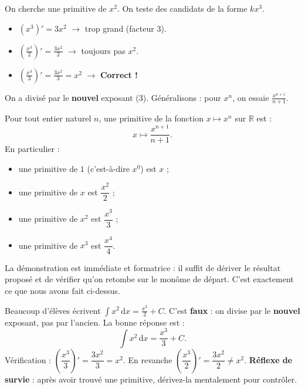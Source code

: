 \documentclass[11pt]{article}
\begin{document}
\begin{experience}
On cherche une primitive de $x^2$. On teste des candidats de la forme $k x^3$.
\begin{itemize}
\item $(x^3)' = 3x^2$ $\to$ trop grand (facteur 3).
\item $\left(\frac{x^3}{2}\right)' = \frac{3x^2}{2}$ $\to$ toujours pas $x^2$.
\item $\left(\frac{x^3}{3}\right)' = \frac{3x^2}{3} = x^2$ $\to$ \textbf{Correct !}
\end{itemize}
On a divisé par le \textbf{nouvel} exposant (3). Généralisons : pour $x^n$, on essaie $\frac{x^{n+1}}{n+1}$.
\end{experience}

\begin{propriete}
Pour tout entier naturel $n$, une primitive de la fonction $x \mapsto x^{n}$ sur $\mathbb{R}$ est :
\[ x \mapsto \frac{x^{n+1}}{n+1}. \]
En particulier :
\begin{itemize}
\item une primitive de $1$ (c'est-à-dire $x^0$) est $x$ ;
\item une primitive de $x$ est $\dfrac{x^{2}}{2}$ ;
\item une primitive de $x^{2}$ est $\dfrac{x^{3}}{3}$ ;
\item une primitive de $x^{3}$ est $\dfrac{x^{4}}{4}$.
\end{itemize}
\end{propriete}

La démonstration est immédiate et formatrice : il suffit de dériver le résultat proposé et de vérifier qu'on retombe sur le monôme de départ. C'est exactement ce que nous avons fait ci-dessus.

\begin{attention}
Beaucoup d'élèves écrivent $\displaystyle\int x^{2}\,\mathrm{d}x = \frac{x^{3}}{2} + C$. C'est \textbf{faux} : on divise par le \textbf{nouvel} exposant, pas par l'ancien. La bonne réponse est :
\[ \int x^{2}\,\mathrm{d}x = \frac{x^{3}}{3} + C. \]
Vérification : $\left(\dfrac{x^{3}}{3}\right)' = \dfrac{3x^{2}}{3} = x^{2}$. En revanche $\left(\dfrac{x^{3}}{2}\right)' = \dfrac{3x^{2}}{2} \neq x^{2}$. \textbf{Réflexe de survie} : après avoir trouvé une primitive, dérivez-la mentalement pour contrôler.
\end{attention}
\end{document}
